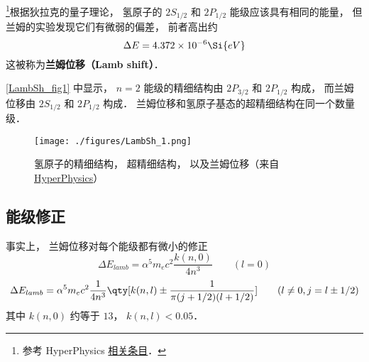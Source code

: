

\footnote{参考 HyperPhysics \href{http://hyperphysics.phy-astr.gsu.edu/hbase/quantum/lamb.html}{相关条目}．}根据狄拉克的量子理论， 氢原子的 $2S_{1/2}$ 和 $2P_{1/2}$ 能级应该具有相同的能量， 但兰姆的实验发现它们有微弱的偏差， 前者高出约
\begin{equation}
\Delta E = 4.372\times 10^{-6} \Si{eV}
\end{equation}
这被称为\textbf{兰姆位移（Lamb shift）}．

\autoref{LambSh_fig1} 中显示， $n=2$ 能级的精细结构由 $2P_{3/2}$ 和 $2P_{1/2}$ 构成， 而兰姆位移由 $2S_{1/2}$ 和 $2P_{1/2}$ 构成． 兰姆位移和氢原子基态的超精细结构在同一个数量级． 
\begin{figure}[ht]
\centering
\texttt{[image: ./figures/LambSh\_1.png]}
\caption{氢原子的精细结构， 超精细结构， 以及兰姆位移（来自 \href{http://hyperphysics.phy-astr.gsu.edu/hbase/quantum/lamb.html}{HyperPhysics}）} \label{LambSh_fig1}
\end{figure}

\subsection{能级修正}
事实上， 兰姆位移对每个能级都有微小的修正
\begin{equation}
\Delta E_{lamb} = \alpha^5 m_e c^2 \frac{k(n, 0)}{4n^3} \qquad (l = 0)
\end{equation}
\begin{equation}
\Delta E_{lamb} =\alpha^5 m_e c^2 \frac{1}{4n^3} \qty[k(n,l) \pm \frac{1}{\pi(j+1/2)(l+1/2)} ] \qquad (l \ne 0, j = l \pm 1/2)
\end{equation}
其中 $k(n, 0)$ 约等于 $13$， $k(n, l) < 0.05$．
